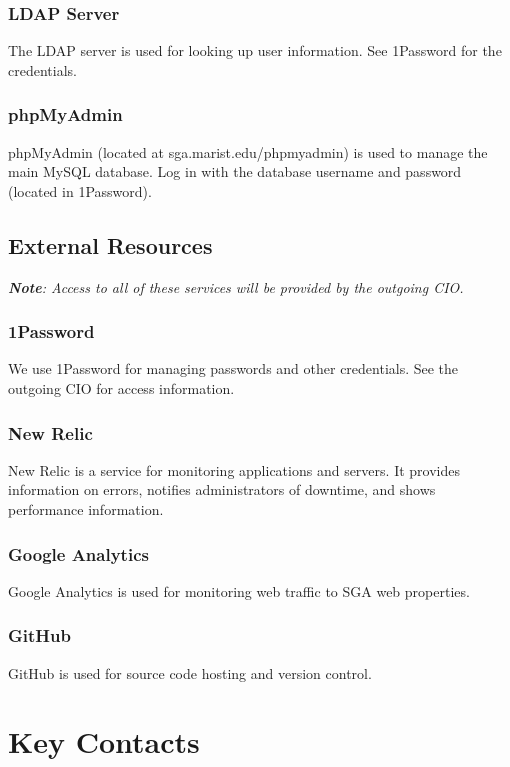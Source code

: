 \documentclass[11pt]{report}
\begin{document}
		\subsection{LDAP Server}
			The LDAP server is used for looking up user information. See 1Password for the credentials.
		
		\subsection{phpMyAdmin}
			phpMyAdmin (located at sga.marist.edu/phpmyadmin) is used to manage the main MySQL database. Log in with the database username and password (located in 1Password).

	\section{External Resources}
		\textit{\textbf{Note}: Access to all of these services will be provided by the outgoing CIO.}
	
		\subsection{1Password}
			We use 1Password for managing passwords and other credentials. See the outgoing CIO for access information.

		\subsection{New Relic}
			New Relic is a service for monitoring applications and servers. It provides information on errors, notifies administrators of downtime, and shows performance information.

		\subsection{Google Analytics}
			Google Analytics is used for monitoring web traffic to SGA web properties.

		\subsection{GitHub}
			GitHub is used for source code hosting and version control.

\chapter{Key Contacts}
\end{document}
